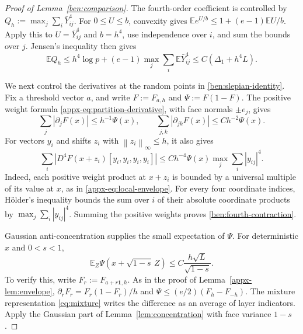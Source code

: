 \documentclass[11pt,letterpaper]{article}
\newenvironment{recovered}{\color{magenta}}{}
\theoremstyle{remark}
\newcommand{\E}{\mathbb E}
\newcommand{\norm}[1]{\left\lVert#1\right\rVert}
\begin{document}
\begin{recovered}
\begin{proof}[Proof of Lemma~\ref{ben:comparison}]
The fourth-order coefficient is controlled by
\(Q_h:=\max_j\sum_i\bar Y_{ij}^4\). For \(0\le U\le b\),
convexity gives \(\E e^{U/b}\le1+(e-1)\E U/b\).
Apply this to \(U=\bar Y_{ij}^4\) and \(b=h^4\), use
independence over \(i\), and sum the bounds over \(j\).
Jensen's inequality then gives
\begin{equation}\label{ben:fourth-maximum}
 \E Q_h\le h^4\log p+(e-1)\max_j\sum_i\E\bar Y_{ij}^4
       \le C(\Delta_1+h^4L).
\end{equation}

We next control the derivatives at the random points in
\eqref{ben:slepian-identity}. Fix a threshold vector \(a\), and
write \(F:=F_{a,h}\) and \(\Psi:=F(1-F)\).
The positive weight formula \eqref{appx-eq:partition-derivative},
with face normals \(\pm e_j\), gives
\[
 \sum_j|\partial_jF(x)|\le h^{-1}\Psi(x),\qquad
 \sum_{j,k}|\partial_{jk}F(x)|\le Ch^{-2}\Psi(x).
\]
For vectors \(y_i\) and shifts \(z_i\) with
\(\norm{z_i}_\infty\le h\), it also gives
\begin{equation}\label{ben:fourth-contraction}
 \sum_i|D^4F(x+z_i)[y_i,y_i,y_i,y_i]|
 \le Ch^{-4}\Psi(x)\max_j\sum_i|y_{ij}|^4.
\end{equation}
Indeed, each positive weight product at \(x+z_i\) is bounded by
a universal multiple of its value at \(x\), as in
\eqref{appx-eq:local-envelope}. For every four coordinate indices,
H\"older's inequality bounds the sum over \(i\) of their absolute
coordinate products by \(\max_j\sum_i|y_{ij}|^4\). Summing the
positive weights proves \eqref{ben:fourth-contraction}.

Gaussian anti-concentration supplies the small expectation of
\(\Psi\). For deterministic \(x\) and \(0<s<1\),
\begin{equation}\label{ben:gaussian-envelope}
 \E_Z\Psi(x+\sqrt{1-s}\,Z)
 \le C\frac{h\sqrt L}{\sqrt{1-s}}.
\end{equation}
To verify this, write \(F_r:=F_{a+r\mathbf1,h}\).
As in the proof of Lemma~\ref{appx-lem:envelope},
\(\partial_rF_r=F_r(1-F_r)/h\) and
\(\Psi\le(e/2)(F_h-F_{-h})\).
The mixture representation \eqref{eq:mixture} writes the difference
as an average of layer indicators. Apply the Gaussian part of
Lemma~\ref{lem:concentration} with face variance \(1-s\).


\end{proof}
\end{recovered}
\end{document}
